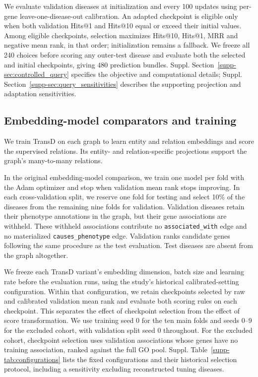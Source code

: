 \documentclass[webpdf,contemporary,large]{oup-authoring-template}%
\theoremstyle{thmstyleone}%
\theoremstyle{thmstyletwo}%
\theoremstyle{thmstylethree}%
\renewcommand{\cite}{\citep}
\begin{document}
We evaluate validation diseases at initialization and every 100 updates using
per-gene leave-one-disease-out calibration. An adapted checkpoint is eligible
only when both validation Hits@1 and Hits@10 equal or exceed their initial
values. Among eligible checkpoints, selection maximizes Hits@10, Hits@1, MRR
and negative mean rank, in that order; initialization remains a fallback.
We freeze all 240 choices before scoring any outer-test disease and evaluate
both the selected and initial checkpoints, giving 480 prediction bundles.
Suppl. Section~\ref{supp-sec:controlled_query} specifies the objective and
computational details; Suppl. Section~\ref{supp-sec:query_sensitivities} describes
the supporting projection and adaptation sensitivities.

\subsection{Embedding-model comparators and training}
\label{sec:lp}

We train TransD \cite{ji2015knowledge} on each graph to learn entity and
relation embeddings and score the supervised relations. Its entity- and
relation-specific projections support the graph's many-to-many relations.

In the original embedding-model comparison, we train one model per fold with the
Adam optimizer \cite{diederik2014adam} and stop when validation mean
rank stops improving. In each cross-validation split, we reserve one fold
for testing and select 10\% of the diseases from the remaining nine folds
for validation. Validation diseases retain their phenotype annotations in the
graph, but their gene associations are withheld. These withheld
associations contribute no \texttt{associated\_with} edge and no materialized
\texttt{causes\_phenotype} edge. Validation ranks candidate genes
following the same procedure as the test evaluation. Test diseases are
absent from the graph altogether.


We freeze each TransD variant's embedding dimension, batch size and learning
rate before the evaluation runs, using the study's historical calibrated-setting
configuration. Within that configuration, we retain checkpoints selected by
raw and calibrated validation mean rank and evaluate both scoring rules on
each checkpoint. This separates the effect of checkpoint selection from the
effect of score transformation. We use training seed 0 for the ten main folds
and seeds 0--9 for the excluded cohort, with validation split seed 0 throughout.
For the excluded cohort, checkpoint selection uses validation associations
whose genes have no training association, ranked against the full GO pool.
Suppl. Table~\ref{supp-tab:configurations} lists the fixed configurations and their historical selection
protocol, including a sensitivity excluding reconstructed tuning diseases.
\end{document}
